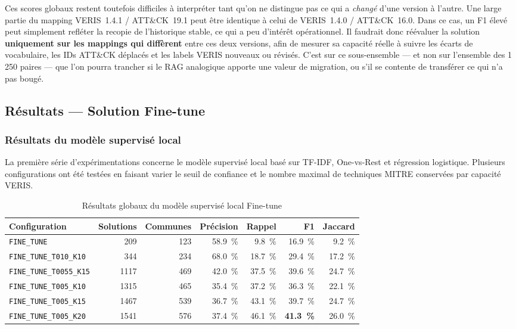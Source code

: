 \documentclass[a4paper,12pt]{article}
\begin{document}
Ces scores globaux restent toutefois difficiles à interpréter tant
qu'on ne distingue pas ce qui a \emph{changé} d'une version à
l'autre. Une large partie du mapping VERIS~1.4.1 / ATT\&CK~19.1 peut
être identique à celui de VERIS~1.4.0 / ATT\&CK~16.0. Dans ce cas,
un F1 élevé peut simplement refléter la recopie de l'historique
stable, ce qui a peu d'intérêt opérationnel. Il faudrait donc
réévaluer la solution \textbf{uniquement sur les mappings qui
diffèrent} entre ces deux versions, afin de mesurer sa capacité
réelle à suivre les écarts de vocabulaire, les IDs ATT\&CK déplacés
et les labels VERIS nouveaux ou révisés. C'est sur ce sous-ensemble
--- et non sur l'ensemble des 1\,250 paires --- que l'on pourra
trancher si le RAG analogique apporte une valeur de migration, ou
s'il se contente de transférer ce qui n'a pas bougé.

\subsection{Résultats --- Solution Fine-tune}

\subsubsection{Résultats du modèle supervisé local}

La première série d'expérimentations concerne le modèle supervisé local basé sur TF-IDF, One-vs-Rest et régression logistique. Plusieurs configurations ont été testées en faisant varier le seuil de confiance et le nombre maximal de techniques MITRE conservées par capacité VERIS.

\begin{table}[H]
\centering
\small
\begin{tabular}{lrrrrrr}
\toprule
Configuration & Solutions & Communes & Précision & Rappel & F1 & Jaccard \\
\midrule
\texttt{FINE\_TUNE} & 209 & 123 & 58.9~\% & 9.8~\% & 16.9~\% & 9.2~\% \\
\texttt{FINE\_TUNE\_T010\_K10} & 344 & 234 & 68.0~\% & 18.7~\% & 29.4~\% & 17.2~\% \\
\texttt{FINE\_TUNE\_T0055\_K15} & 1117 & 469 & 42.0~\% & 37.5~\% & 39.6~\% & 24.7~\% \\
\texttt{FINE\_TUNE\_T005\_K10} & 1315 & 465 & 35.4~\% & 37.2~\% & 36.3~\% & 22.1~\% \\
\texttt{FINE\_TUNE\_T005\_K15} & 1467 & 539 & 36.7~\% & 43.1~\% & 39.7~\% & 24.7~\% \\
\texttt{FINE\_TUNE\_T005\_K20} & 1541 & 576 & 37.4~\% & 46.1~\% & \textbf{41.3~\%} & 26.0~\% \\
\bottomrule
\end{tabular}
\caption{Résultats globaux du modèle supervisé local Fine-tune}
\label{tab:fine-tune-local-results}
\end{table}
\end{document}
